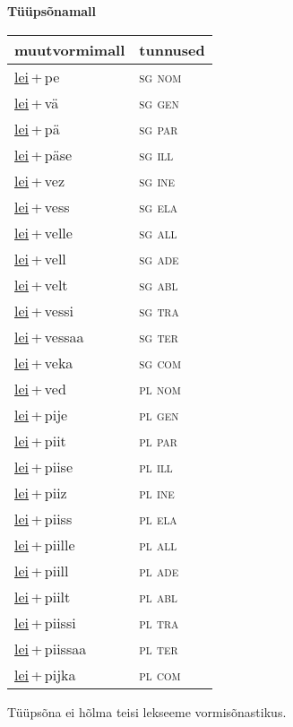 
\vspace{1.8em}
\begin{minipage}{\textwidth}
\textbf{Tüüpsõnamall \,}\\

\begin{sideways}
\begin{tabular}{l l}
muutvormimall & tunnused \\
\hline
\underline{lei}\,+\,pe & \textsc{ sg nom } \\
\underline{lei}\,+\,vä & \textsc{ sg gen } \\
\underline{lei}\,+\,pä & \textsc{ sg par } \\
\underline{lei}\,+\,päse & \textsc{ sg ill } \\
\underline{lei}\,+\,vez & \textsc{ sg ine } \\
\underline{lei}\,+\,vess & \textsc{ sg ela } \\
\underline{lei}\,+\,velle & \textsc{ sg all } \\
\underline{lei}\,+\,vell & \textsc{ sg ade } \\
\underline{lei}\,+\,velt & \textsc{ sg abl } \\
\underline{lei}\,+\,vessi & \textsc{ sg tra } \\
\underline{lei}\,+\,vessaa & \textsc{ sg ter } \\
\underline{lei}\,+\,veka & \textsc{ sg com } \\
\underline{lei}\,+\,ved & \textsc{ pl nom } \\
\underline{lei}\,+\,pije & \textsc{ pl gen } \\
\underline{lei}\,+\,piit & \textsc{ pl par } \\
\underline{lei}\,+\,piise & \textsc{ pl ill } \\
\underline{lei}\,+\,piiz & \textsc{ pl ine } \\
\underline{lei}\,+\,piiss & \textsc{ pl ela } \\
\underline{lei}\,+\,piille & \textsc{ pl all } \\
\underline{lei}\,+\,piill & \textsc{ pl ade } \\
\underline{lei}\,+\,piilt & \textsc{ pl abl } \\
\underline{lei}\,+\,piissi & \textsc{ pl tra } \\
\underline{lei}\,+\,piissaa & \textsc{ pl ter } \\
\underline{lei}\,+\,pijka & \textsc{ pl com } \\
\end{tabular}
\end{sideways}
\label{tab:tüüpsõnamall-leipe}

\end{minipage}

 
\vspace{1em}
\noindent Tüüpsõna ei hõlma teisi lekseeme vormi\-sõnastikus.
